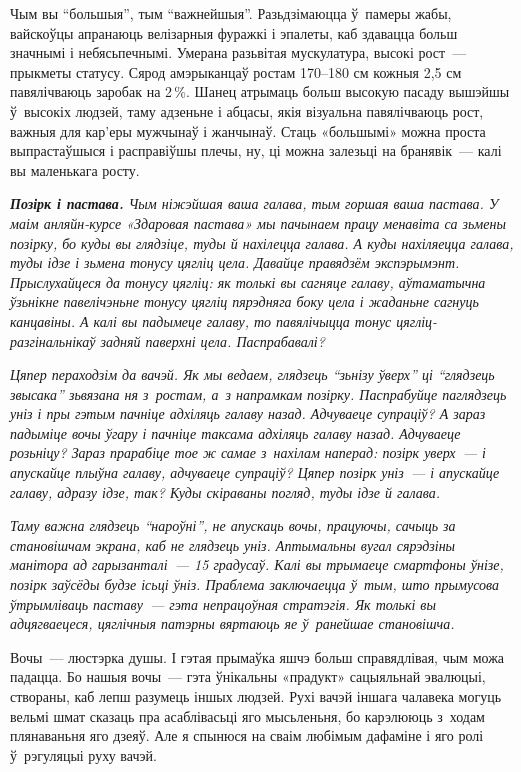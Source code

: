 Чым вы ``большыя'', тым ``важнейшыя''. Разьдзімаюцца ў~памеры жабы, вайскоўцы апранаюць велізарныя фуражкі і эпалеты, каб здавацца больш значнымі і небясьпечнымі. Умерана разьвітая мускулатура, высокі рост~--- прыкметы статусу. Сярод амэрыканцаў ростам 170--180 см кожныя 2,5 см павялічваюць заробак на 2\,\%. Шанец атрымаць больш высокую пасаду вышэйшы ў~высокіх людзей, таму адзеньне і абцасы, якія візуальна павялічваюць рост, важныя для кар'еры мужчынаў і жанчынаў. Стаць «большымі» можна проста выпрастаўшыся і расправіўшы плечы, ну, ці можна залезьці на бранявік~--- калі вы маленькага росту. 

\emph{\textbf{Позірк і пастава.} Чым ніжэйшая ваша галава, тым горшая ваша пастава. У маім анляйн-курсе «Здаровая пастава» мы пачынаем працу менавіта са зьмены позірку, бо куды вы глядзіце, туды й нахілецца галава. А куды нахіляецца галава, туды ідзе і зьмена тонусу цягліц цела. Давайце правядзём экспэрымэнт. Прыслухайцеся да тонусу цягліц: як толькі вы сагняце галаву, аўтаматычна ўзьнікне павелічэньне тонусу цягліц пярэдняга боку цела і жаданьне сагнуць канцавіны. А калі вы падымеце галаву, то павялічыцца тонус цягліц-разгінальнікаў задняй паверхні цела. Паспрабавалі?}

\emph{Цяпер пераходзім да вачэй. Як мы ведаем, глядзець ``зьнізу ўверх'' ці ``глядзець звысака'' зьвязана ня з~ростам, а~з напрамкам позірку. Паспрабуйце паглядзець уніз і пры гэтым пачніце адхіляць галаву назад. Адчуваеце супраціў? А зараз падыміце вочы ўгару і пачніце таксама адхіляць галаву назад. Адчуваеце розьніцу? Зараз прарабіце тое ж самае з~нахілам наперад: позірк уверх~--- і апускайце плыўна галаву, адчуваеце супраціў? Цяпер позірк уніз~--- і апускайце галаву, адразу ідзе, так? Куды скіраваны погляд, туды ідзе й галава.}

\emph{Таму важна глядзець ``нароўні'', не апускаць вочы, працуючы, сачыць за становішчам экрана, каб не глядзець уніз. Аптымальны вугал сярэдзіны манітора ад гарызанталі~--- 15 градусаў. Калі вы трымаеце смартфоны ўнізе, позірк заўсёды будзе ісьці ўніз. Праблема заключаецца ў~тым, што прымусова ўтрымліваць паставу~--- гэта непрацоўная стратэгія. Як толькі вы адцягваецеся, цяглічныя патэрны вяртаюць яе ў~ранейшае становішча.}

Вочы~--- люстэрка душы. І гэтая прымаўка яшчэ больш справядлівая, чым можа падацца. Бо нашыя вочы~--- гэта ўнікальны «прадукт» сацыяльнай эвалюцыі, створаны, каб лепш разумець іншых людзей. Рухі вачэй іншага чалавека могуць вельмі шмат сказаць пра асаблівасьці яго мысьленьня, бо карэлююць з~ходам плянаваньня яго дзеяў. Але я спынюся на сваім любімым дафаміне і яго ролі ў~рэгуляцыі руху вачэй.

